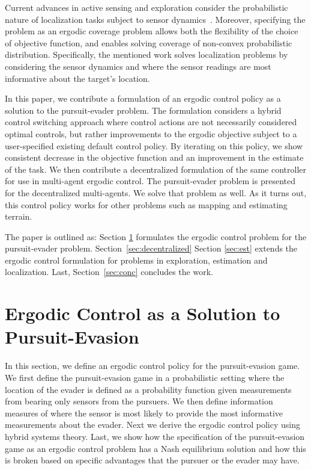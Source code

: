 \documentclass[conference]{IEEEtran}
\begin{document}
Current advances in active sensing and exploration consider the probabilistic nature of localization tasks subject to sensor dynamics~\cite{miller2016ergodic, miller2015optimalrange,ansari2016sequential}.
Moreover, specifying the problem as an ergodic coverage problem allows both the flexibility of the choice of objective function, and enables solving coverage of non-convex probabilistic distribution.
Specifically, the mentioned work solves localization problems by considering the sensor dynamics and where the sensor readings are most informative about the target's location.

In this paper, we contribute a formulation of an ergodic control policy as a solution to the pursuit-evader problem.
The formulation considers a hybrid control switching approach where control actions are not necessarily considered optimal controls, but rather improvements to the ergodic objective subject to a user-specified existing default control policy.
By iterating on this policy, we show consistent decrease in the objective function and an improvement in the estimate of the task.
We then contribute a decentralized formulation of the same controller for use in multi-agent ergodic control.
The pursuit-evader problem is presented for the decentralized multi-agents.
We solve that problem as well.
As it turns out, this control policy works for other problems such as mapping and estimating terrain.

The paper is outlined as: Section \ref{sec:ergcontrol} formulates the ergodic control problem for the pursuit-evader problem.
Section~\ref{sec:decentralized}
Section \ref{sec:est} extends the ergodic control formulation for problems in exploration, estimation and localization.
Last, Section~\ref{sec:conc} concludes the work.

\section{Ergodic Control as a Solution to Pursuit-Evasion} \label{sec:ergcontrol}

In this section, we define an ergodic control policy for the pursuit-evasion game. 
We first define the pursuit-evasion game in a probabilistic setting where the location of the evader is defined as a probability function given measurements from bearing only sensors from the pursuers. 
We then define information measures of where the sensor is most likely to provide the most informative measurements about the evader.
Next we derive the ergodic control policy using hybrid systems theory. 
Last, we show how the specification of the pursuit-evasion game as an ergodic control problem has a Nash equilibrium solution and how this is broken based on specific advantages that the pursuer or the evader may have.
\end{document}
